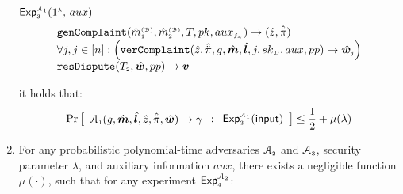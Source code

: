\begin{definition}[Privacy]
\begin{enumerate}
\begin{center}
{{\begin{mybox}[colback=white,  width=77.5mm, height=60mm, left=-2mm, drop fuzzy shadow southwest]{$\mathsf{Exp}_{\st 3}^{\st\mathcal{A}_{\st 1}}(1^{\st\lambda}\text{, }  {aux})$}
$$\begin{array}{l}
%
\mathtt{genComplaint}(\hat m^{\st\mathcal{(B)}}_{\st 1}, \hat m^{\st\mathcal{(B)}}_{\st2}, T, pk, {aux}_{\st f_{_\gamma}})\rightarrow (\hat z, \hat{\ddot \pi})\\
%
 \forall j, j\in [n]:
\Big(\mathtt{verComplaint}( \hat z, \hat{\ddot{\pi}}, g, \hat{\bm m}, \hat{\bm{l}}, j, sk_{\st\mathcal D}, aux, pp)\rightarrow \hat{\bm{w}}_{\st j}
\Big)
\\
\mathtt{resDispute}(T_{\st 2}, \hat {\bm w}, pp)\rightarrow \bm v
\\
%
%
   \end{array} 
$$
\end{mybox}
}}
\end{center}
it holds that:
%
$$ \Pr\left[
  \begin{array}{l}
  
 
\mathcal{A}_{\st 1}(g, \hat {\bm m}, \hat{\bm l}, \hat z, \hat{\ddot \pi}, \hat{\bm{w}})\rightarrow \gamma
\end{array} :
    \begin{array}{l}
    \mathsf{Exp}_{\st 3}^{\st\mathcal{A}_{\st 1}}(\mathsf{input})\\
\end{array}    \right]\leq \frac{1}{2}+\mu(\lambda)$$




\item For any probabilistic polynomial-time  adversaries $\mathcal{A}_{\scriptscriptstyle 2}$ and  $\mathcal{A}_{\scriptscriptstyle 3}$, security parameter $\lambda$, and  auxiliary information $aux$, there exists a negligible function $\mu(\cdot)$, such that for any  experiment $\mathsf{Exp}_{\scriptscriptstyle 4}^{\mathcal{A}_{\scriptscriptstyle 2}}$:


\end{enumerate}
\end{definition}
